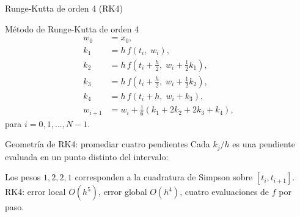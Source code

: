 \documentclass[aspectratio=169,10pt]{beamer}
\begin{document}
\begin{frame}{Runge-Kutta de orden 4 (RK4)}
\vspace{2pt}
\begin{defbox}{M\'etodo de Runge-Kutta de orden 4}
\begin{align*}
  w_0   &= x_0, \\
  k_1   &= h\,f(t_i,\;w_i), \\
  k_2   &= h\,f\!\left(t_i + \tfrac{h}{2},\; w_i + \tfrac{1}{2}k_1\right), \\
  k_3   &= h\,f\!\left(t_i + \tfrac{h}{2},\; w_i + \tfrac{1}{2}k_2\right), \\
  k_4   &= h\,f\!\left(t_i + h,\;             w_i + k_3\right), \\
  w_{i+1} &= w_i + \tfrac{1}{6}\!\left(k_1 + 2k_2 + 2k_3 + k_4\right),
\end{align*}
para $i = 0,1,\ldots,N-1$.
\end{defbox}
\end{frame}

\begin{frame}{Geometr\'ia de RK4: promediar cuatro pendientes}
\vspace{2pt}
Cada $k_j/h$ es una pendiente evaluada en un punto distinto del intervalo:

\vspace{4pt}
\begin{center}
\end{center}

\vspace{2pt}
\textcolor{textgray}{\small
Los pesos $1,2,2,1$ corresponden a la cuadratura de Simpson sobre $[t_i,t_{i+1}]$.
RK4: error local $O(h^5)$, error global $O(h^4)$, cuatro evaluaciones de $f$ por paso.}
\end{frame}
\end{document}

